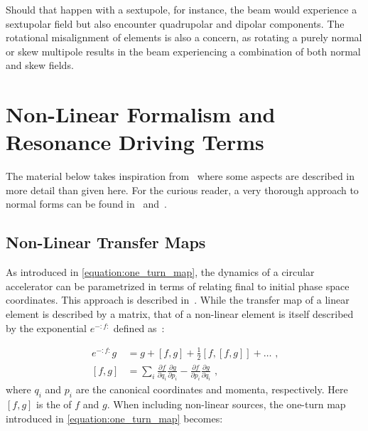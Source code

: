 Should that happen with a sextupole, for instance, the beam would experience a sextupolar field but also encounter quadrupolar and dipolar components.
The rotational misalignment of elements is also a concern, as rotating a purely normal or skew multipole results in the beam experiencing a combination of both normal and skew fields.

\section{Non-Linear Formalism and Resonance Driving Terms}
\label{section:non_linear_formalism_and_rdts}

The material below takes inspiration from~\cite{PHD:Tomas, PHD:Franchi,PHD:Maclean, PHD:Persson} where some aspects are described in more detail than given here.
For the curious reader, a very thorough approach to normal forms can be found in~\cite{PHD:Carlier} and~\cite{PRAB:Franchi:First_Simultaneous}.

\subsection{Non-Linear Transfer Maps}
\label{subsection:non_linear_transfer_maps}

As introduced in \cref{equation:one_turn_map}, the dynamics of a circular accelerator can be parametrized in terms of  relating final to initial phase space coordinates.
This approach is described in~\cite{BOOK:Bazzani:Normal_Form_Approach_Betatron_Motion, JMP:Forest:Hamiltonian_Free_Description_Single_Particle_Dynamics}.
While the transfer map of a linear element is described by a matrix, that of a non-linear element is itself described by the exponential  \(e^{-:f:}\) defined as~\cite{BOOK:Wolski:Beam_dynamics}:

\begin{equation}
    \begin{aligned}
        e^{-:f:} g          &= g + \left[f, g\right] + \frac{1}{2} \left[f, \left[f, g \right] \right] + \ldots \text{ ,} \\
        \left[ f, g \right] &= \sum_i \frac{\partial f}{\partial q_i} \frac{\partial g}{\partial p_i} - \frac{\partial f}{\partial p_i} \frac{\partial g}{\partial q_i} \text{ ,}
    \end{aligned}
    \label{equation:lie_operator}
\end{equation}
where \(q_i\) and \(p_i\) are the canonical coordinates and momenta, respectively.
Here \(\left[ f, g \right]\) is the  of \(f\) and \(g\).
When including non-linear sources, the one-turn map introduced in \cref{equation:one_turn_map} becomes:

